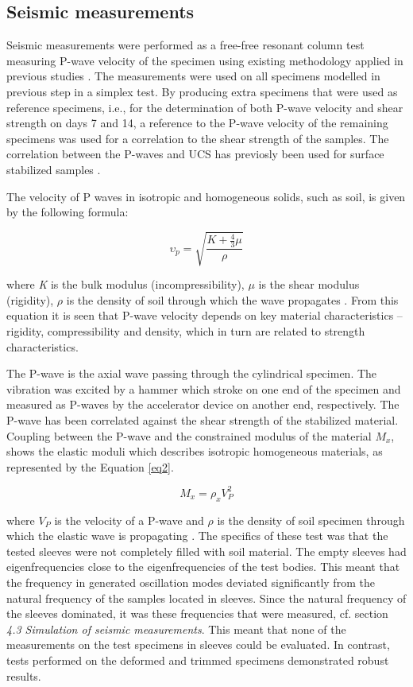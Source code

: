 \documentclass[USenglish,twocolumn]{article}
\begin{document}
\subsection{Seismic measurements}
Seismic measurements were performed as a free-free resonant column test measuring P-wave velocity of the specimen using existing methodology applied in previous studies \citep{Lindh202210,Lindh202102}. The measurements were used on all specimens modelled in previous step in a simplex test. By producing extra specimens that were used as reference specimens, i.e., for the determination of both P-wave velocity and shear strength on days 7 and 14, a reference to the P-wave velocity of the remaining specimens was used for a correlation to the shear strength of the samples. The correlation between the P-waves and UCS has previosly been used for surface stabilized samples \cite{Rydenetal2006,Rydenetal2016}. 

The velocity of P waves in isotropic and homogeneous solids, such as soil, is given by the following formula: 

\begin{equation} \label{eq2}
	\upsilon_p=\sqrt{\frac{K+\frac{4}{3}\mu}{\rho} }
\end{equation}

where \emph{K} is the bulk modulus (incompressibility), $\mu$ is the shear modulus (rigidity), $\rho$ is the density of soil through which the wave propagates \cite{Fowler}. From this equation it is seen that P-wave velocity depends on key material characteristics -- rigidity, compressibility and density, which in turn are related to strength characteristics.

The P-wave is the axial wave passing through the cylindrical specimen. The vibration was excited by a hammer which stroke on one end of the specimen and measured as P-waves by the accelerator device on another end, respectively. The P-wave has been correlated against the shear strength of the stabilized material. Coupling between the P-wave and the constrained modulus of the material $M_x$, shows the elastic moduli which describes isotropic homogeneous materials, as represented by the Equation \ref{eq2}.

\begin{equation} \label{eq2}
	M_x=\rho_x V_P^2
\end{equation}

where $V_P$ is the velocity of a P-wave and $\rho$ is the density of soil specimen through which the elastic wave is propagating \cite{Mavko}. The specifics of these test was that the tested sleeves were not completely filled with soil material. The empty sleeves had eigenfrequencies close to the eigenfrequencies of the test bodies. This meant that the frequency in generated oscillation modes deviated significantly from the natural frequency of the samples located in sleeves. Since the natural frequency of the sleeves dominated, it was these frequencies that were measured, cf. section \emph{4.3 Simulation of seismic measurements}. This meant that none of the measurements on the test specimens in sleeves could be evaluated. In contrast, tests performed on the deformed and trimmed specimens demonstrated robust results.
\end{document}
